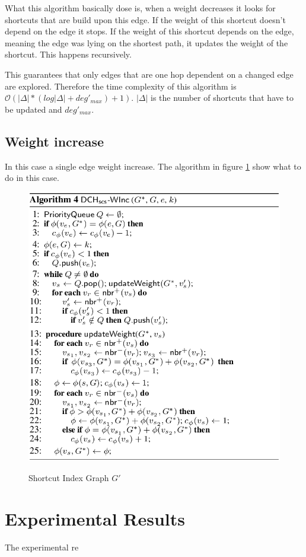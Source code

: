 \documentclass[twocolumn]{article}
\begin{document}
What this algorithm basically dose is, when a weight decreases it looks for shortcuts that are build upon this edge.
If the weight of this shortcut doesn't depend on the edge it stops. If the weight of this shortcut depends on the edge, 
meaning the edge was lying on the shortest path, it updates the weight of the shortcut. This happens recursively.

This guarantees that only edges that are one hop dependent on a changed edge are explored. Therefore the time complexity 
of this algorithm is $\mathcal{O}(\vert\Delta\vert  * (log \vert \Delta \vert + deg'_{max}) + 1)$.  $\vert\Delta\vert$ is the
number of shortcuts that have to be updated and $deg'_{max}$. 

\subsection{Weight increase}
In this case a single edge weight increase. The algorithm in figure \ref{fig:increaseAlgorithm} 
show what to do in this case. 

\begin{figure}[ht]
    \caption{Shortcut Index Graph $G'$}
    \centering
    \includegraphics[width=\linewidth]{increaseAlgorithm}
    \label{fig:increaseAlgorithm}
\end{figure}


\section{Experimental Results}

The experimental re

\newpage



\listoffigures
\end{document}
